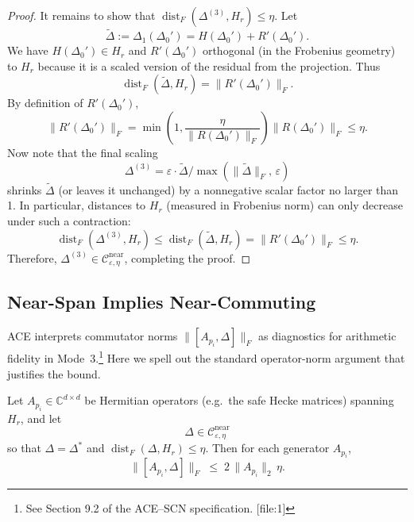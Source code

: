 \documentclass[11pt]{article}
\begin{document}
\begin{proof}
It remains to show that \( \operatorname{dist}_F(\Delta^{(3)}, H_r) \le \eta \). Let
\[
\widetilde{\Delta} := \Delta_1(\Delta_0') = H(\Delta_0') + R'(\Delta_0').
\]
We have \( H(\Delta_0')\in H_r \) and \( R'(\Delta_0') \) orthogonal (in the Frobenius geometry) to \( H_r \) because it is a scaled version of the residual from the projection. Thus
\[
\operatorname{dist}_F(\widetilde{\Delta},H_r) = \|R'(\Delta_0')\|_F.
\]
By definition of \( R'(\Delta_0') \),
\[
\|R'(\Delta_0')\|_F
  = \min\!\left(1,\frac{\eta}{\|R(\Delta_0')\|_F}\right)\|R(\Delta_0')\|_F
  \le \eta.
\]
Now note that the final scaling
\[
\Delta^{(3)} = \varepsilon \cdot \widetilde{\Delta}/\max(\|\widetilde{\Delta}\|_F,\,\varepsilon)
\]
shrinks \(\widetilde{\Delta}\) (or leaves it unchanged) by a nonnegative scalar factor no larger than 1. In particular, distances to \(H_r\) (measured in Frobenius norm) can only decrease under such a contraction:
\[
\operatorname{dist}_F(\Delta^{(3)},H_r)
  \le \operatorname{dist}_F(\widetilde{\Delta},H_r)
  = \|R'(\Delta_0')\|_F
  \le \eta.
\]
Therefore, \( \Delta^{(3)} \in \mathcal{C}^{\mathrm{near}}_{\varepsilon,\eta} \), completing the proof.
\end{proof}

\subsection{Near-Span Implies Near-Commuting}

ACE interprets commutator norms \( \|[A_{p_i},\Delta]\|_F \) as diagnostics for arithmetic fidelity in Mode~3.\footnote{See Section 9.2 of the ACE--SCN specification. [file:1]} Here we spell out the standard operator-norm argument that justifies the bound.

\begin{proposition}\label{prop:near-comm}
Let \( A_{p_i} \in \mathbb{C}^{d\times d} \) be Hermitian operators (e.g.\ the safe Hecke matrices) spanning \(H_r\), and let
\[
\Delta \in \mathcal{C}^{\mathrm{near}}_{\varepsilon,\eta}
\]
so that \( \Delta = \Delta^* \) and \( \operatorname{dist}_F(\Delta,H_r)\le \eta \). Then for each generator \(A_{p_i}\),
\[
\|[A_{p_i},\Delta]\|_F \;\le\; 2\,\|A_{p_i}\|_2\,\eta.
\]
\end{proposition}
\end{document}
